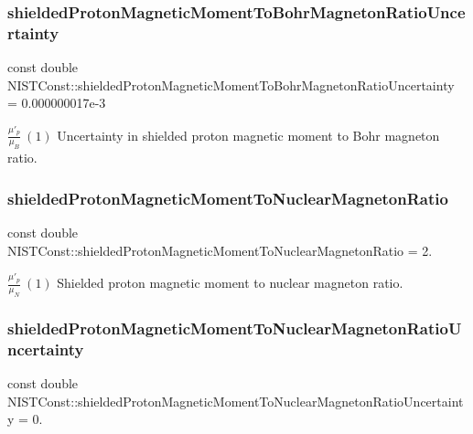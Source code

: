 \subsubsection{\texorpdfstring{shielded\+Proton\+Magnetic\+Moment\+To\+Bohr\+Magneton\+Ratio\+Uncertainty}{shieldedProtonMagneticMomentToBohrMagnetonRatioUncertainty}}
{\footnotesize\ttfamily const double N\+I\+S\+T\+Const\+::shielded\+Proton\+Magnetic\+Moment\+To\+Bohr\+Magneton\+Ratio\+Uncertainty = 0.\+000000017e-\/3}

$\frac{\mu'_p}{\mu_B} \ (1)$ Uncertainty in shielded proton magnetic moment to Bohr magneton ratio. \mbox{\label{group___proton_ga03e84ef0d1452fa7c647f8866913fbc3}} 
\subsubsection{\texorpdfstring{shielded\+Proton\+Magnetic\+Moment\+To\+Nuclear\+Magneton\+Ratio}{shieldedProtonMagneticMomentToNuclearMagnetonRatio}}
{\footnotesize\ttfamily const double N\+I\+S\+T\+Const\+::shielded\+Proton\+Magnetic\+Moment\+To\+Nuclear\+Magneton\+Ratio = 2.}

$\frac{\mu'_p}{\mu_N} \ (1)$ Shielded proton magnetic moment to nuclear magneton ratio. \mbox{\label{group___proton_ga26b2c035f1b78ca42fc9340314e5a106}} 
\subsubsection{\texorpdfstring{shielded\+Proton\+Magnetic\+Moment\+To\+Nuclear\+Magneton\+Ratio\+Uncertainty}{shieldedProtonMagneticMomentToNuclearMagnetonRatioUncertainty}}
{\footnotesize\ttfamily const double N\+I\+S\+T\+Const\+::shielded\+Proton\+Magnetic\+Moment\+To\+Nuclear\+Magneton\+Ratio\+Uncertainty = 0.}


